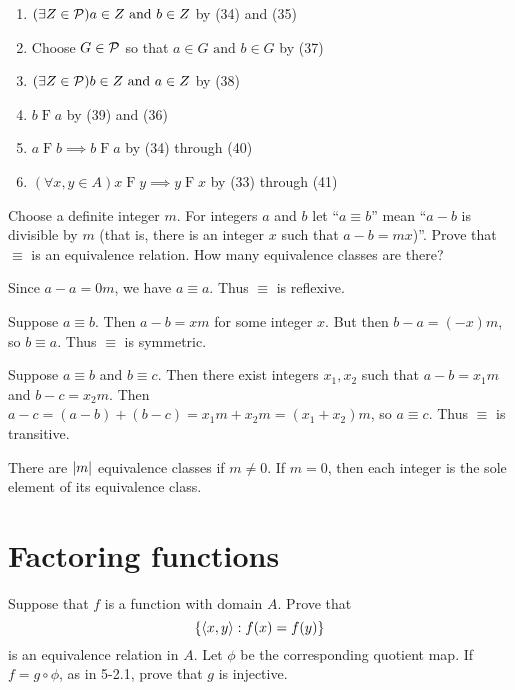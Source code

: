 \documentclass{report}
\renewcommand*{\land}{\text{ and }}
\begin{document}
\begin{solution}
\begin{enumerate}[label=(\arabic*)]
    \item \quad\quad $(\exists Z\in\mc P)a\in Z\land b\in Z$ \hfill by (34) and (35)
    \item \quad\quad Choose $G\in\mathcal{P}$ so that $a\in G\land b\in G$ \hfill by (37)
    \item \quad\quad $(\exists Z\in\mc P)b\in Z\land a\in Z$ \hfill by (38)
    \item \quad\quad $b\mathrel F a$ \hfill by (39) and (36)
    \item \quad $a\mathrel F b \implies b\mathrel F a$ \hfill by (34) through (40)
    \item $(\forall x, y\in A)x\mathrel F y \implies y \mathrel F x$ \hfill by (33) through (41)
\end{enumerate}
\end{solution}

\begin{exercise}
Choose a definite integer $m$. For integers $a$ and $b$ let ``$a\equiv b$'' mean
``$a - b$ is divisible by $m$ (that is, there is an integer $x$ such that $a-b=mx$)''.
Prove that $\equiv$ is an equivalence relation. How many equivalence classes are there?
\end{exercise}

\begin{solution}
Since $a-a=0m$, we have $a\equiv a$. Thus $\equiv$ is reflexive.

Suppose $a\equiv b$. Then $a-b=xm$ for some integer $x$. But then $b-a=(-x)m$,
so $b\equiv a$. Thus $\equiv$ is symmetric.

Suppose $a\equiv b$ and $b\equiv c$. Then there exist integers $x_1,x_2$ such that
$a-b=x_1m$ and $b-c=x_2m$.
Then $a-c=(a-b)+(b-c)=x_1m+x_2m=(x_1+x_2)m$, so $a\equiv c$. Thus $\equiv$ is transitive.

There are $\left\lvert m\right\rvert$ equivalence classes if $m\neq 0$. If $m=0$, then each integer is
the sole element of its equivalence class.
\end{solution}
\section{Factoring functions}

\begin{exercise}
Suppose that $f$ is a function with domain $A$. Prove that
\[\left\{ \left\langle x,y\right\rangle : f(x)=f(y) \right\}\]
is an equivalence relation in $A$. Let $\phi$ be the corresponding quotient map.
If $f = g\circ \phi$,
as in 5-2.1, prove that $g$ is injective.
\end{exercise}
\end{document}

